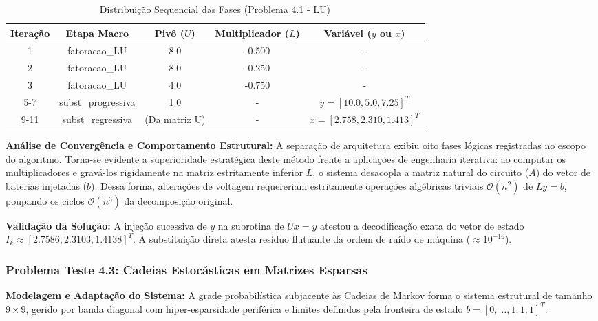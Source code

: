 \begin{table}[H]
\centering
\footnotesize
\caption{Distribuição Sequencial das Fases (Problema 4.1 - LU)}
\label{tab:lu_prob41}
\begin{tabular}{ccccc}
\hline
\textbf{Iteração} & \textbf{Etapa Macro} & \textbf{Pivô ($U$)} & \textbf{Multiplicador ($L$)} & \textbf{Variável ($y$ ou $x$)} \\ \hline
1 & fatoracao\_LU & 8.0 & -0.500 & - \\ 
2 & fatoracao\_LU & 8.0 & -0.250 & - \\ 
3 & fatoracao\_LU & 4.0 & -0.750 & - \\ 
5-7 & subst\_progressiva & 1.0 & - & $y =[10.0, 5.0, 7.25]^T$ \\ 
9-11 & subst\_regressiva & (Da matriz U) & - & $x =[2.758, 2.310, 1.413]^T$ \\ \hline
\end{tabular}
\end{table}

\textbf{Análise de Convergência e Comportamento Estrutural:} A separação de arquitetura exibiu oito fases lógicas registradas no escopo do algoritmo. Torna-se evidente a superioridade estratégica deste método frente a aplicações de engenharia iterativa: ao computar os multiplicadores e gravá-los rigidamente na matriz estritamente inferior $L$, o sistema desacopla a matriz natural do circuito ($A$) do vetor de baterias injetadas ($b$). Dessa forma, alterações de voltagem requereriam estritamente operações algébricas triviais $\mathcal{O}(n^2)$ de $Ly=b$, poupando os ciclos $\mathcal{O}(n^3)$ da decomposição original.

\textbf{Validação da Solução:} A injeção sucessiva de $y$ na subrotina de $Ux=y$ atestou a decodificação exata do vetor de estado $I_k \approx[2.7586, 2.3103, 1.4138]^T$. A substituição direta atesta resíduo flutuante da ordem de ruído de máquina ($\approx 10^{-16}$).

\subsubsection{Problema Teste 4.3: Cadeias Estocásticas em Matrizes Esparsas}

\textbf{Modelagem e Adaptação do Sistema:} A grade probabilística subjacente às Cadeias de Markov forma o sistema estrutural de tamanho $9 \times 9$, gerido por banda diagonal com hiper-esparsidade periférica e limites definidos pela fronteira de estado $b=[0, \dots, 1, 1, 1]^T$. 

